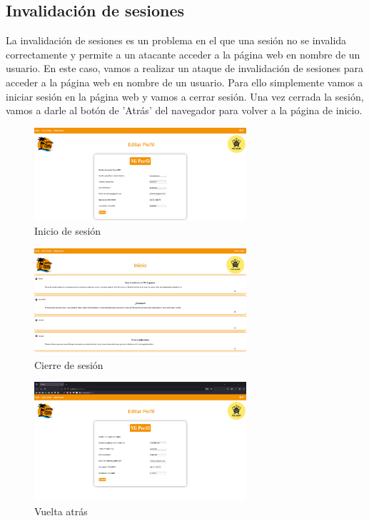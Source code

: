 \documentclass{report}
\begin{document}
            \subsection{Invalidación de sesiones}
                La invalidación de sesiones es un problema en el que una sesión no se invalida correctamente y permite a un atacante acceder a la página web en nombre de un usuario.
                En este caso, vamos a realizar un ataque de invalidación de sesiones para acceder a la página web en nombre de un usuario.
                Para ello simplemente vamos a iniciar sesión en la página web y vamos a cerrar sesión.
                Una vez cerrada la sesión, vamos a darle al botón de 'Atrás' del navegador para volver a la página de inicio.
                \begin{figure}[H]
                    \centering
                    \includegraphics[width=0.7\textwidth]{./img/vulnerabilidades/2.6/1.1.png}
                    \caption{Inicio de sesión}
                \end{figure}
                \begin{figure}[H]
                    \centering
                    \includegraphics[width=0.7\textwidth]{./img/vulnerabilidades/2.6/1.2.png}
                    \caption{Cierre de sesión}
                \end{figure}
                \begin{figure}[H]
                    \centering
                    \includegraphics[width=0.7\textwidth]{./img/vulnerabilidades/2.6/1.3.png}
                    \caption{Vuelta atrás}
                \end{figure}
\end{document}
